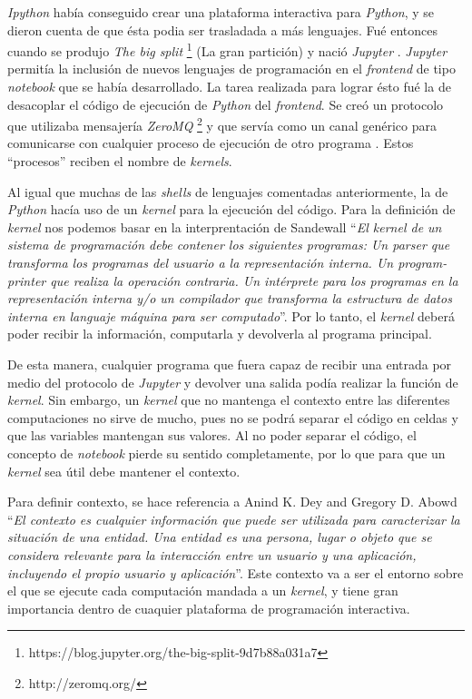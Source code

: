 \documentclass[11pt,spanish,listoffigures]{tfgetsinf}
\begin{document}
\textit{Ipython} había conseguido crear una plataforma interactiva para \textit{Python}, y se dieron cuenta de que ésta podia ser trasladada a más lenguajes. Fué entonces cuando se produjo\textit{ The big split} \footnote{https://blog.jupyter.org/the-big-split-9d7b88a031a7} (La gran partición) y nació \textit{Jupyter} \cite{jupyter-nb}. \textit{Jupyter} permitía la inclusión de nuevos lenguajes de programación en el \textit{frontend} de tipo \textit{notebook} que se había desarrollado. La tarea realizada para lograr ésto fué la de desacoplar el código de ejecución de \textit{Python} del \textit{frontend}. Se creó un protocolo que utilizaba mensajería \textit{ZeroMQ} \footnote{http://zeromq.org/} y que servía como un canal genérico para comunicarse con cualquier proceso de ejecución de otro programa \cite{wire-protocol}. Estos ``procesos'' reciben el nombre de \textit{kernels}.

Al igual que muchas de las \textit{shells} de lenguajes comentadas anteriormente, la de \textit{Python} hacía uso de un \textit{kernel} para la ejecución del código. Para la definición de \textit{kernel} nos podemos basar en la interprentación de Sandewall ``\textit{El kernel de un sistema de programación debe contener los siguientes programas: Un parser que transforma los programas del usuario a la representación interna. Un program-printer que realiza la operación contraria. Un intérprete para los programas en la representación interna y/o un compilador que transforma la estructura de datos interna en languaje máquina para ser computado}''\cite{Sandewall}. Por lo tanto, el \textit{kernel} deberá poder recibir la información, computarla y devolverla al programa principal.

De esta manera, cualquier programa que fuera capaz de recibir una entrada por medio del protocolo de \textit{Jupyter} y devolver una salida podía realizar la función de \textit{kernel}. Sin embargo, un \textit{kernel} que no mantenga el contexto entre las diferentes computaciones no sirve de mucho, pues no se podrá separar el código en celdas y que las variables mantengan sus valores. Al no poder separar el código, el concepto de \textit{notebook} pierde su sentido completamente, por lo que para que un \textit{kernel} sea útil debe mantener el contexto.

Para definir contexto, se hace referencia a Anind K. Dey and Gregory D. Abowd \cite{context} ``\textit{El contexto es cualquier información que puede ser utilizada para caracterizar la situación de una entidad. Una entidad es una persona, lugar o objeto que se considera relevante para la interacción entre un usuario y una aplicación, incluyendo el propio usuario y aplicación}''. Este contexto va a ser el entorno sobre el que se ejecute cada computación mandada a un \textit{kernel}, y tiene gran importancia dentro de cuaquier plataforma de programación interactiva.
\end{document}
